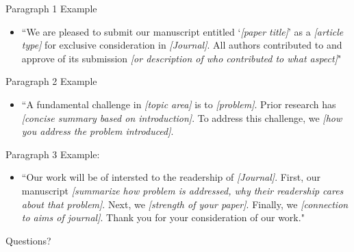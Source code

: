 \documentclass[aspectratio=169]{beamer}
\begin{document}
\begin{frame}{Paragraph 1}
	Example
	\begin{itemize}
		\item``We are pleased to submit our manuscript entitled `\textit{[paper title]}' as a \textit{[article type]} for exclusive consideration in \textit{[Journal]}. All authors contributed to and approve of its submission \textit{[or description of who contributed to what aspect]}"
	\end{itemize}
\end{frame}

\begin{frame}{Paragraph 2}
	Example
	\begin{itemize}
		\item ``A fundamental challenge in \textit{[topic area]} is to \textit{[problem]}. Prior research has \textit{[concise summary based on introduction]}. To address this challenge, we \textit{[how you address the problem introduced]}. 
	\end{itemize}
\end{frame}

\begin{frame}{Paragraph 3}
	Example:
	\begin{itemize}
		\item ``Our work will be of intersted to the readership of \textit{[Journal]}. First, our manuscript \textit{[summarize how problem is addressed, why their readership cares about that problem]}. Next, we \textit{[strength of your paper]}. Finally, we \textit{[connection to aims of journal]}. Thank you for your consideration of our work."
	\end{itemize}
\end{frame}

\begin{frame}{Questions?}
	~
\end{frame}
\end{document}
